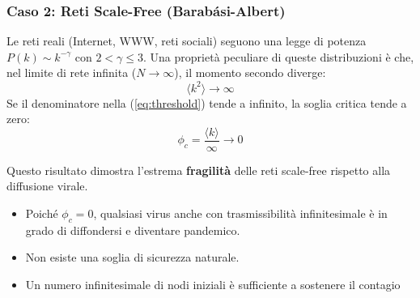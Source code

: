 \subsubsection{Caso 2: Reti Scale-Free (Barabási-Albert)}
Le reti reali (Internet, WWW, reti sociali) seguono una legge di potenza $P(k) \sim k^{-\gamma}$ con $2 < \gamma \le 3$.
Una proprietà peculiare di queste distribuzioni è che, nel limite di rete infinita ($N \to \infty$), il momento secondo diverge:
\begin{equation}
    \langle k^2 \rangle \to \infty
\end{equation}
Se il denominatore nella (\ref{eq:threshold}) tende a infinito, la soglia critica tende a zero:
\begin{equation}
    \phi_c = \frac{\langle k \rangle}{\infty} \longrightarrow 0
\end{equation}

Questo risultato dimostra l'estrema \textbf{fragilità} delle reti scale-free rispetto alla diffusione virale.
\begin{itemize}
    \item Poiché $\phi_c = 0$, qualsiasi virus anche con trasmissibilità infinitesimale è in grado di diffondersi e diventare pandemico.
    \item Non esiste una soglia di sicurezza naturale.
    \item Un numero infinitesimale di nodi iniziali è sufficiente a sostenere il contagio 
\end{itemize}

